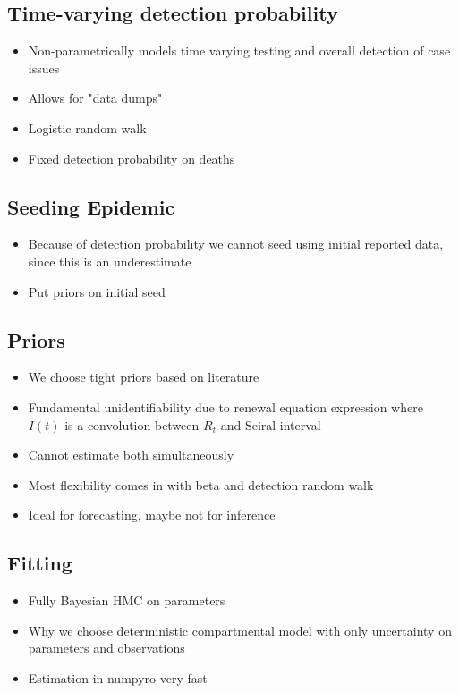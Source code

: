 \documentclass[11pt]{amsart}
\begin{document}
 \subsection{Time-varying detection probability}
  \begin{itemize}
 \item Non-parametrically models time varying testing and overall detection of case issues
 \item Allows for "data dumps"
 \item Logistic random walk 
 \item Fixed detection probability on deaths

  \end{itemize}

\subsection{Seeding Epidemic}

 \begin{itemize}
 \item Because of detection probability we cannot seed using initial reported data, since this is an underestimate
 \item Put priors on initial seed
  \end{itemize}
  
  \subsection{Priors}

 \begin{itemize}
 \item We choose tight priors based on literature
  \item Fundamental unidentifiability due to renewal equation expression where $I(t)$ is a convolution between $R_t$ and Seiral interval
  \item Cannot estimate both simultaneously 
  \item Most flexibility comes in with beta and detection random walk
  \item Ideal for forecasting, maybe not for inference
  \end{itemize}
  
  \subsection{Fitting}

 \begin{itemize}
 \item Fully Bayesian HMC on parameters
 \item Why we choose deterministic compartmental model with only uncertainty on parameters and observations
 \item Estimation in numpyro very fast
   \end{itemize}
   
\end{document}
